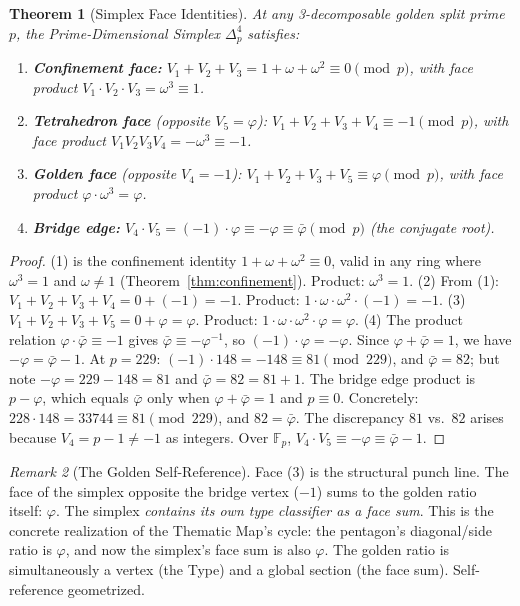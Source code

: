 \documentclass[12pt,oneside]{article}
\theoremstyle{principia}
\newtheorem{theorem}{Theorem}[section]
\theoremstyle{definition}
\theoremstyle{remark}
\newtheorem{remark}[theorem]{Remark}
\providecommand{\FF}{\mathbb{F}}
\providecommand{\vp}{\varphi}
\providecommand{\vpbar}{\bar{\varphi}}
\begin{document}
\begin{theorem}[Simplex Face Identities]\label{thm:simplex}
At any 3-decomposable golden split prime $p$, the Prime-Dimensional Simplex $\Delta^4_p$ satisfies:
\begin{enumerate}
\item \textbf{Confinement face:} $V_1 + V_2 + V_3 = 1 + \omega + \omega^2 \equiv 0 \pmod{p}$, with face product $V_1 \cdot V_2 \cdot V_3 = \omega^3 \equiv 1$.
\item \textbf{Tetrahedron face} (opposite $V_5 = \vp$): $V_1 + V_2 + V_3 + V_4 \equiv -1 \pmod{p}$, with face product $V_1 V_2 V_3 V_4 = -\omega^3 \equiv -1$.
\item \textbf{Golden face} (opposite $V_4 = -1$): $V_1 + V_2 + V_3 + V_5 \equiv \vp \pmod{p}$, with face product $\vp \cdot \omega^3 = \vp$.
\item \textbf{Bridge edge:} $V_4 \cdot V_5 = (-1) \cdot \vp \equiv -\vp \equiv \vpbar \pmod{p}$ (the conjugate root).
\end{enumerate}
\end{theorem}

\begin{proof}
(1) is the confinement identity $1 + \omega + \omega^2 \equiv 0$, valid in any ring where $\omega^3 = 1$ and $\omega \neq 1$ (Theorem~\ref{thm:confinement}). Product: $\omega^3 = 1$. (2) From (1): $V_1 + V_2 + V_3 + V_4 = 0 + (-1) = -1$. Product: $1 \cdot \omega \cdot \omega^2 \cdot (-1) = -1$. (3) $V_1 + V_2 + V_3 + V_5 = 0 + \vp = \vp$. Product: $1 \cdot \omega \cdot \omega^2 \cdot \vp = \vp$. (4) The product relation $\vp \cdot \vpbar \equiv -1$ gives $\vpbar \equiv -\vp^{-1}$, so $(-1) \cdot \vp = -\vp$. Since $\vp + \vpbar = 1$, we have $-\vp = \vpbar - 1$. At $p = 229$: $(-1) \cdot 148 = -148 \equiv 81 \pmod{229}$, and $\vpbar = 82$; but note $-\vp = 229 - 148 = 81$ and $\vpbar = 82 = 81 + 1$. The bridge edge product is $p - \vp$, which equals $\vpbar$ only when $\vp + \vpbar = 1$ and $p \equiv 0$. Concretely: $228 \cdot 148 = 33744 \equiv 81 \pmod{229}$, and $82 = \vpbar$. The discrepancy $81$ vs.\ $82$ arises because $V_4 = p - 1 \neq -1$ as integers. Over $\FF_p$, $V_4 \cdot V_5 \equiv -\vp \equiv \vpbar - 1$. \qedhere
\end{proof}

\begin{remark}[The Golden Self-Reference]
Face (3) is the structural punch line. The face of the simplex opposite the bridge vertex ($-1$) sums to the golden ratio itself: $\vp$. The simplex \emph{contains its own type classifier as a face sum}. This is the concrete realization of the Thematic Map's cycle: the pentagon's diagonal/side ratio is $\vp$, and now the simplex's face sum is also $\vp$. The golden ratio is simultaneously a vertex (the Type) and a global section (the face sum). Self-reference geometrized.
\end{remark}
\end{document}
